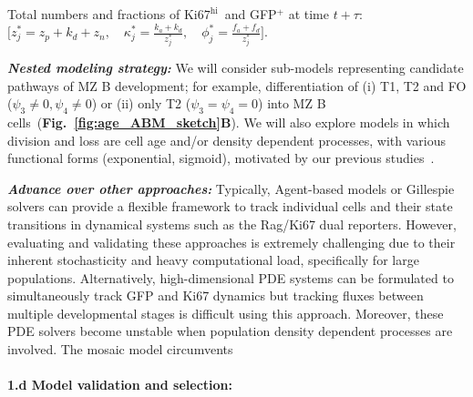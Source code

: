 \documentclass[11pt]{article}
\newcommand{\khi}{\ensuremath{\text{Ki67}^\text{hi}}~}
\newcommand{\para}[1]{\vspace*{-4.5mm}\paragraph{#1}}
\begin{document}
\begin{mybox}
\vspace{1mm}
Total numbers and fractions of \khi and GFP$^+$ at time $t+\tau:$
$\bigg[ z_{j}^* = z_{p} + k_{d} + z_{n}, \quad \kappa_j^* = \frac{k_{a} + k_{d}}{z_{j}^*}, \quad \phi_j^* = \frac{f_{a} + f_{d}}{z_{j}^*}\bigg].$

\end{mybox}
\textbf{\textit{Nested modeling strategy:}} We will consider sub-models representing candidate pathways of MZ B development; for example, differentiation of (i) T1, T2 and FO ($\psi_{3}\neq0, \psi_{4}\neq0$) or (ii) only T2 ($\psi_{3} = \psi_{4} = 0$) into MZ B cells~(\textbf{Fig.~\ref{fig:age_ABM_sketch}B}).
We will also explore models in which division and loss are cell age and/or density dependent processes, with various functional forms (exponential, sigmoid), motivated by our previous studies~\cite{Rane_2022, Verheijen_2020, Rane_2018}.%


\textbf{\textit{Advance over other approaches:}}
Typically, Agent-based models or Gillespie solvers can provide a flexible framework to track individual cells and their state transitions in dynamical systems such as the Rag/Ki67 dual reporters. 
However, evaluating and validating these approaches is extremely challenging due to their inherent stochasticity and heavy computational load, specifically for large populations. 
Alternatively, high-dimensional PDE systems can be formulated to simultaneously track GFP and Ki67 dynamics but tracking fluxes between multiple developmental stages is difficult using this approach.
Moreover, these PDE solvers become unstable when population density dependent processes are involved.
The mosaic model circumvents  

\para{{1.d Model validation and selection:}} \label{sec:stats-validation}
\end{document}
